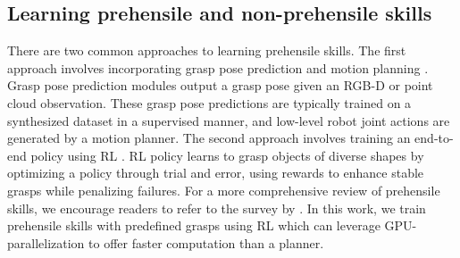 \subsection{Learning prehensile and non-prehensile skills}
There are two common approaches to learning prehensile skills. The first approach involves incorporating grasp pose prediction and motion planning \cite{fang2023anygrasp, mahler2017dex, sundermeyer2021contact}. Grasp pose prediction modules output a grasp pose given an RGB-D or point cloud observation. These grasp pose predictions are typically trained on a synthesized dataset in a supervised manner, and low-level robot joint actions are generated by a motion planner. The second approach involves training an end-to-end policy using RL \cite{joshi2020robotic, kalashnikov2018scalable, wang2022goal}. RL policy learns to grasp objects of diverse shapes by optimizing a policy through trial and error, using rewards to enhance stable grasps while penalizing failures. For a more comprehensive review of prehensile skills, we encourage readers to refer to the survey by \citet{xie2023learning}. In this work, we train prehensile skills with predefined grasps using RL which can leverage GPU-parallelization to offer faster computation than a planner.




